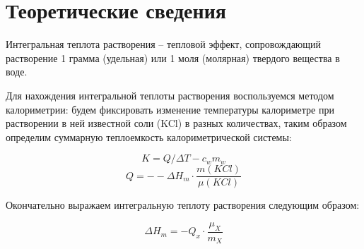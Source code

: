 \documentclass[a4paper, 12pt]{article}
\begin{document}
\section{Теоретические сведения}
Интегральная теплота растворения – тепловой эффект, сопровождающий растворение 1 грамма (удельная) или 1 моля (молярная) твердого вещества в воде. \par \vspace{0.3 cm}
Для нахождения интегральной теплоты растворения воспользуемся методом 
калориметрии: будем фиксировать изменение температуры
калориметре при растворении в ней известной соли (KCl) в разных количествах, таким образом определим 
суммарную теплоемкость калориметрической системы:
\begin{center}
\[
K = Q/\Delta T - c_wm_w
\]
\[
Q = --\Delta H_m \cdot \frac{m(KCl)}{\mu(KCl)}
\]
\par \vspace{0.3 cm}
\end{center}
Окончательно выражаем интегральную теплоту растворения следующим образом:
\begin{center}
\[
\Delta H_m = - Q_x \cdot \frac{\mu_X}{m_X}
\]
\end{center}
\end{document}

